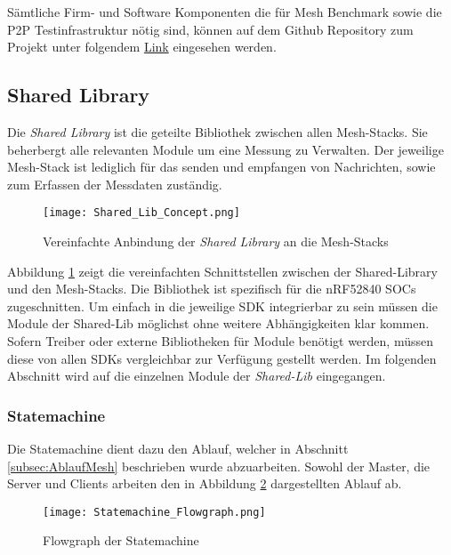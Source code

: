 Sämtliche Firm- und Software Komponenten die für Mesh Benchmark sowie die P2P Testinfrastruktur nötig sind, können auf dem Github Repository zum Projekt unter folgendem \href{https://github.com/Rouben94/P6_Software}{Link\footnotemark[\value{footnote}]}  eingesehen werden.





\subsection{Shared Library}\label{subsec:SharedLibrary}

Die \textit{Shared Library} ist die geteilte Bibliothek zwischen allen Mesh-Stacks. Sie beherbergt alle relevanten Module um eine Messung zu Verwalten. Der jeweilige Mesh-Stack ist lediglich für das senden und empfangen von Nachrichten, sowie zum Erfassen der Messdaten zuständig. 


\begin{figure}[H]
	\centering
	\texttt{[image: Shared\_Lib\_Concept.png]}
	\caption{Vereinfachte Anbindung der \textit{Shared Library} an die Mesh-Stacks}\label{fig:ShardeLibConcept}
\end{figure}

Abbildung \ref{fig:ShardeLibConcept} zeigt die vereinfachten Schnittstellen zwischen der Shared-Library und den Mesh-Stacks. Die Bibliothek ist spezifisch für die nRF52840 SOCs zugeschnitten. Um einfach in die jeweilige SDK integrierbar zu sein müssen die Module der Shared-Lib möglichst ohne weitere Abhängigkeiten klar kommen. Sofern Treiber oder externe Bibliotheken für Module benötigt werden, müssen diese von allen SDKs vergleichbar zur Verfügung gestellt werden. Im folgenden Abschnitt wird auf die einzelnen Module der \textit{Shared-Lib} eingegangen. 


\subsubsection{Statemachine}\label{subsubsec:StatemachineSoftware}

Die Statemachine dient dazu den Ablauf, welcher in Abschnitt \ref{subsec:AblaufMesh} beschrieben wurde abzuarbeiten. Sowohl der Master, die Server und Clients arbeiten den in Abbildung \ref{fig:StatemachineFLowgraph} dargestellten Ablauf ab. 

\begin{figure}[H]
	\centering
	\texttt{[image: Statemachine\_Flowgraph.png]}
	\caption{Flowgraph der Statemachine}\label{fig:StatemachineFLowgraph}
\end{figure}


